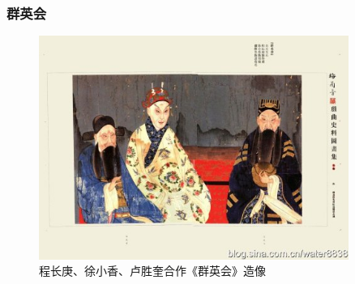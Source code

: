 \documentclass[cjk,slidestop,compress,mathserif,blue]{beamer}
\begin{document}
\frame
{
	\frametitle{群英会}
\begin{figure}[h!]
\centering
\vspace{-0.2in}
\includegraphics[height=0.55\textwidth,width=0.90\textwidth,viewport=39 41 313 221,clip]{Figures/Qunyinghui-2.jpeg}
\caption{程长庚、徐小香、卢胜奎合作《群英会》造像}
\label{Qunyinghui}
\end{figure}
}
\end{document}
